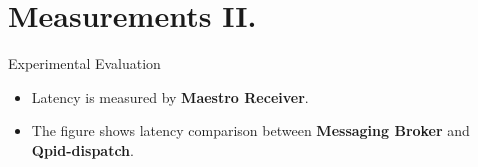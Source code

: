 \documentclass[hyperref={pdfpagelabels=false, unicode},pdf,slideColor,fyma,9pt]{beamer}
\begin{document}
		\section{Measurements II.}
    \begin{frame}{Experimental Evaluation}
      \begin{itemize}
          \setlength\itemsep{0.5em}
          \item Latency is measured by \textbf{Maestro Receiver}.
          \item The figure shows latency comparison between \textbf{Messaging Broker} and \textbf{Qpid-dispatch}.
      \end{itemize}
      \begin{figure}[ht]
        \begin{center}
        \end{center}
      \end{figure}
    \end{frame}
\end{document}
